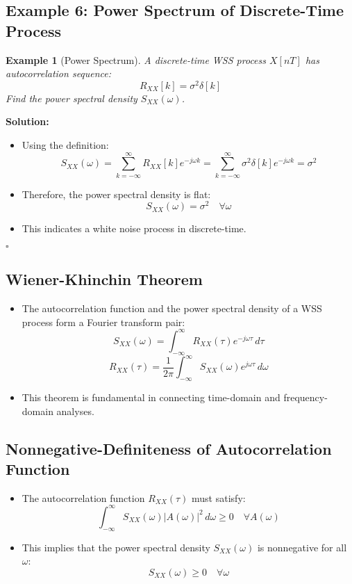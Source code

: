 \documentclass[12pt]{article}
\newtheorem{example}{Example}
\newenvironment{solution}{\noindent\textbf{Solution:}}{\hfill$\square$}
\begin{document}
\subsection{Example 6: Power Spectrum of Discrete-Time Process}
\begin{example}[Power Spectrum]
A discrete-time WSS process \( X[nT] \) has autocorrelation sequence:
\[
R_{XX}[k] = \sigma^2 \delta[k]
\]
Find the power spectral density \( S_{XX}(\omega) \).
\end{example}
\begin{solution}
\begin{itemize}
    \item Using the definition:
    \[
    S_{XX}(\omega) = \sum_{k=-\infty}^{\infty} R_{XX}[k] e^{-j\omega k} = \sum_{k=-\infty}^{\infty} \sigma^2 \delta[k] e^{-j\omega k} = \sigma^2
    \]
    \item Therefore, the power spectral density is flat:
    \[
    S_{XX}(\omega) = \sigma^2 \quad \forall \omega
    \]
    \item This indicates a white noise process in discrete-time.
\end{itemize}
\end{solution}

\subsection{Wiener-Khinchin Theorem}
\begin{itemize}
    \item The autocorrelation function and the power spectral density of a WSS process form a Fourier transform pair:
    \[
    S_{XX}(\omega) = \int_{-\infty}^{\infty} R_{XX}(\tau) e^{-j\omega \tau} \, d\tau
    \]
    \[
    R_{XX}(\tau) = \frac{1}{2\pi} \int_{-\infty}^{\infty} S_{XX}(\omega) e^{j\omega \tau} \, d\omega
    \]
    \item This theorem is fundamental in connecting time-domain and frequency-domain analyses.
\end{itemize}

\subsection{Nonnegative-Definiteness of Autocorrelation Function}
\begin{itemize}
    \item The autocorrelation function \( R_{XX}(\tau) \) must satisfy:
    \[
    \int_{-\infty}^{\infty} S_{XX}(\omega) |A(\omega)|^2 \, d\omega \geq 0 \quad \forall A(\omega)
    \]
    \item This implies that the power spectral density \( S_{XX}(\omega) \) is nonnegative for all \( \omega \):
    \[
    S_{XX}(\omega) \geq 0 \quad \forall \omega
    \]
\end{itemize}
\end{document}
